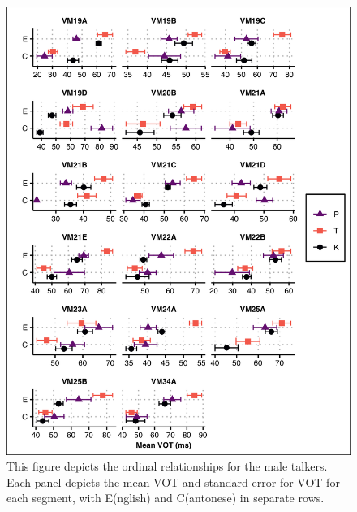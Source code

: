 \begin{figure}[htbp]
  \begin{center}
  \includegraphics[width=0.9\linewidth]{figures/ch4_ordrel_vm_5in.png} 
  \caption{This figure depicts the ordinal relationships for the male talkers. Each panel depicts the mean VOT and standard error for VOT for each segment, with E(nglish) and C(antonese) in separate rows.}
  \label{ch4:fig:ordrelvm}
  \end{center}
\end{figure}


